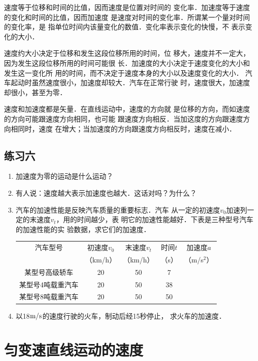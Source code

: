     速度等于位移和时间的比值，因而速度是位置对时间的
变化率．加速度等于速度的变化和时间的比值，因而加速度
是速度对时间的变化率．所谓某一个量对时间的变化率，是
指单位时间内该量变化的数值．变化率表示变化的快慢，不
表示变化的大小．

    速度约大小决定于位移和发生这段位移所用的时间，位
移大，速度并不一定大，因为发生这段位移所用的时间可能很
长．加速度的大小决定于速度变化的大小和发生这一变化所
用的时间，而不决定于速度本身的大小以及速度变化的大小．
汽车起动时虽然速度很小，加速度却较大．汽车在正常行驶
时，速度很大，加速度却很小，甚至为零．

    速度和加速度都是矢量．在直线运动中，速度的方向就
是位移的方向，而如速度的方向可能跟速度方向相同，也可能
跟速度方向相反．当加这度的方向跟速度方向相同时，速度
在增大；当加速度的方向跟速度方向相反时，速度在减小．

\subsection*{练习六}
\begin{enumerate}
\item  加速度为零的运动是什么运动？
\item  有人说：速度越大表示加速度也越大．这话对吗？为什么？
\item  汽车的加速性能是反映汽车质量的重要标志．汽车
从一定的初速度$v_0$加速列一定的末速度$v_t$，用的时间越少，表
明它的加速性能越好．下表是三种型号汽车的加速性能的实
验数据，求它们的加速度．

\begin{center}
\begin{tabular}{ccccc}
\hline
汽车型号 & 初速度$v_0$ & 末速度$v_t$ & 时间$t$ & 加速度$a$\\
& （km/h）& （km/h）& （s）& （m/s$^2$）\\
\hline
某型号高级轿车& 20& 50& 7 \\
某型号4吨载重汽车& 20& 50& 38\\
某型号8吨载重汽车& 20& 50& 50\\
\hline
\end{tabular}
\end{center}

\item   以18$\text{m}/\text{s}$的速度行驶的火车，制动后经15秒停止，
求火车的加速度．

\end{enumerate}

\section{匀变速直线运动的速度}
